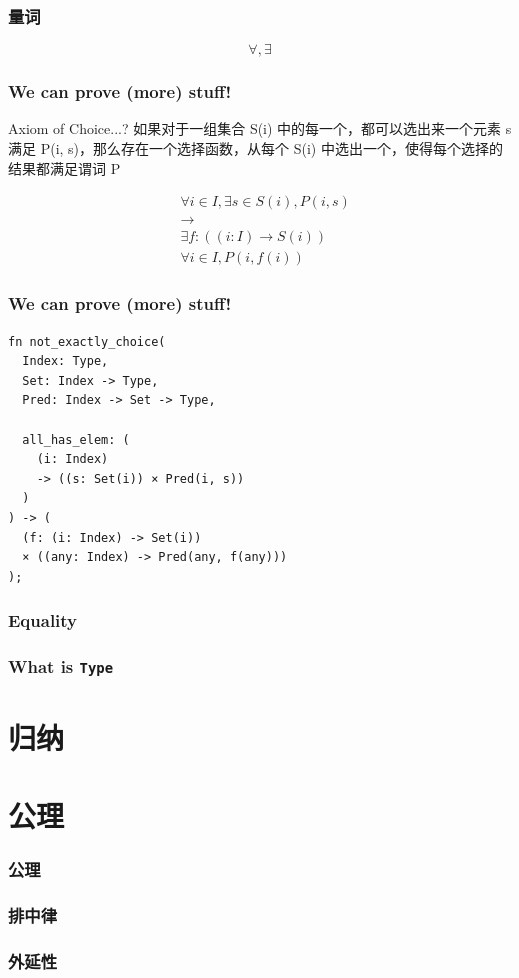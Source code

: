 \documentclass[UTF-8]{ctexbeamer}
\begin{document}
\begin{frame}
  \frametitle{量词}

  \pause
  $$
  \forall, \exists
  $$
\end{frame}

\begin{frame}[fragile]
  \frametitle{We can prove (more) stuff!}

  \begin{block}{Axiom of Choice...?}
  如果对于一组集合 S(i) 中的每一个，都可以选出来一个元素 s 满足 P(i, s)，那么存在一个选择函数，从每个 S(i) 中选出一个，使得每个选择的结果都满足谓词 P
  \end{block}

  \pause

  $$
  \begin{aligned}
  &\forall i \in I, \exists s \in S(i), P(i, s) \\
  &\rightarrow \\
  &\exists f: ((i: I) \rightarrow S(i)) \\
  &\forall i \in I, P(i, f(i))
  \end{aligned}
  $$
\end{frame}

\begin{frame}[fragile]
  \frametitle{We can prove (more) stuff!}

  \begin{verbatim}
fn not_exactly_choice(
  Index: Type,
  Set: Index -> Type,
  Pred: Index -> Set -> Type,

  all_has_elem: (
    (i: Index)
    -> ((s: Set(i)) × Pred(i, s))
  )
) -> (
  (f: (i: Index) -> Set(i))
  × ((any: Index) -> Pred(any, f(any)))
);
  \end{verbatim}
\end{frame}

\begin{frame}
  \frametitle{Equality}
\end{frame}

\begin{frame}
  \frametitle{What is \texttt{Type}}
\end{frame}

\section{归纳}

\section{公理}

\begin{frame}
  \frametitle{公理}
\end{frame}

\begin{frame}
  \frametitle{排中律}
\end{frame}

\begin{frame}
  \frametitle{外延性}
\end{frame}
\end{document}
